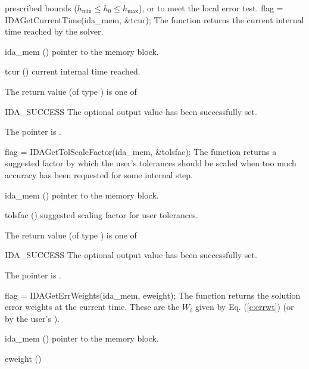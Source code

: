 {{  prescribed bounds ($h_{\min} \le h_0 \le h_{\max}$), or to meet the
  local error test.
}
{
  flag = IDAGetCurrentTime(ida\_mem, \&tcur);
}
{
  The function  returns the
  current internal time reached by the solver.
}
{
  \begin{args}
  \item[ida\_mem] ()
    pointer to the {\ida} memory block.
  \item[tcur] ()
    current internal time reached.
  \end{args}
}
{
  The return value  (of type ) is one of
  \begin{args}
  \item[IDA\_SUCCESS]
    The optional output value has been successfully set.
  \item[\Id{IDA\_MEM\_NULL}]
    The  pointer is .
  \end{args}
}
{}
{
  flag = IDAGetTolScaleFactor(ida\_mem, \&tolsfac);
}
{
  The function  returns a
  suggested factor by which the user's tolerances
  should be scaled when too much accuracy has been
  requested for some internal step.
}
{
  \begin{args}[tolsfac]
  \item[ida\_mem] ()
    pointer to the {\ida} memory block.
  \item[tolsfac] ()
    suggested scaling factor for user tolerances.
  \end{args}
}
{
  The return value  (of type ) is one of
  \begin{args}
  \item[IDA\_SUCCESS]
    The optional output value has been successfully set.
  \item[\Id{IDA\_MEM\_NULL}]
    The  pointer is .
  \end{args}
}
{}
{
  flag = IDAGetErrWeights(ida\_mem, eweight);
}
{
  The function  returns the solution error weights
  at the current time. These are the $W_i$ given by Eq. (\ref{e:errwt})
  (or by the user's ).
}
{
  \begin{args}[eweight]
  \item[ida\_mem] ()
    pointer to the {\ida} memory block.
  \item[eweight] ()

\end{args}}}
